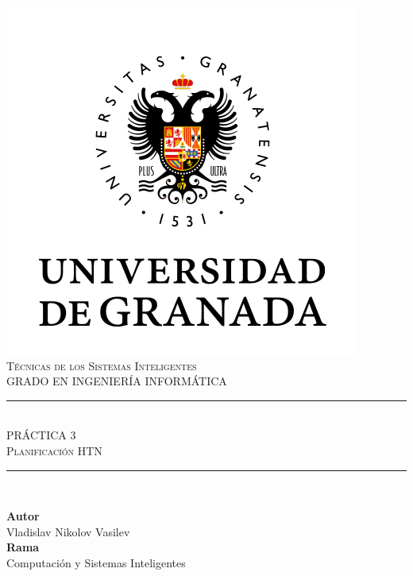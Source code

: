 \documentclass[11pt,a4paper]{article}
\newcommand{\asignatura}{Técnicas de los Sistemas Inteligentes}
\newcommand{\autor}{Vladislav Nikolov Vasilev}
\begin{document}

\begin{titlepage}

\begin{minipage}{\textwidth}

\centering

\includegraphics[scale=0.5]{img/ugr.png}\\

\textsc{\Large \asignatura{}\\[0.2cm]}
\textsc{GRADO EN INGENIERÍA INFORMÁTICA}\\[1cm]

\noindent\rule[-1ex]{\textwidth}{1pt}\\[1.5ex]
\textsc{{\Huge PRÁCTICA 3\\[0.5ex]}}
\textsc{{\Large Planificación HTN\\}}
\noindent\rule[-1ex]{\textwidth}{2pt}\\[3.5ex]

\end{minipage}

\vspace{0.5cm}

\begin{minipage}{\textwidth}

\centering

\textbf{Autor}\\ {\autor{}}\\[2.5ex]
\textbf{Rama}\\ {Computación y Sistemas Inteligentes}\\[2.5ex]
\vspace{0.3cm}


\end{minipage}
\end{titlepage}
\end{document}
